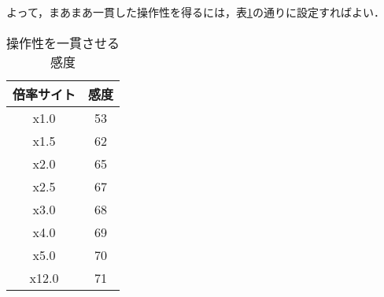 \documentclass[uplatex, dvipdfmx, ja=standard, a4paper]{bxjsarticle}
\begin{document}
よって，まあまあ一貫した操作性を得るには，表\ref{sugsensi}の通りに設定すればよい．

\begin{table}[htbp]
  \centering
  \caption{操作性を一貫させる感度}
  \label{sugsensi}
  \begin{tabular}{c|c}
    倍率サイト & 感度 \\ \hline
    x1.0 & 53 \\
    x1.5 & 62 \\
    x2.0 & 65 \\
    x2.5 & 67 \\
    x3.0 & 68 \\
    x4.0 & 69 \\
    x5.0 & 70 \\
    x12.0 & 71
  \end{tabular}
\end{table}
\end{document}
